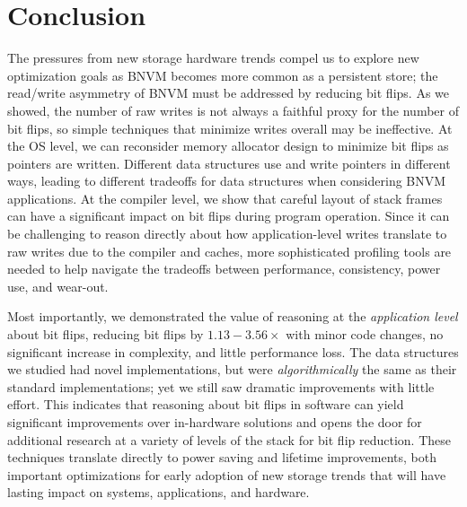 \section{Conclusion}
\label{sec:conclusion}

The pressures from new storage hardware trends compel us to explore new optimization goals as BNVM
becomes more common as a persistent store; the read/write asymmetry of BNVM must be addressed by
reducing bit flips.
As we showed, the
number of raw writes is not always a faithful proxy for the number of bit flips,
so simple techniques that minimize writes overall may be ineffective.
At the OS level, we can reconsider memory allocator design to
minimize bit flips as pointers are written. Different data structures use and
write pointers in different ways, leading to different tradeoffs for data
structures when considering BNVM applications. At the compiler level, we show
that careful layout of stack frames can have a significant impact on bit flips
during program operation. Since it can be challenging to reason directly about
how application-level writes translate to raw writes due to the compiler and
caches, more sophisticated profiling tools are needed to help navigate the
tradeoffs between performance, consistency, power use, and wear-out.

Most importantly, we demonstrated the value of reasoning at the \emph{application level} about bit
flips, reducing bit flips by $1.13-3.56\times$ with minor code changes, no significant increase in
complexity, and little performance loss. The data structures we studied had novel implementations,
but were \textit{algorithmically} the same as their standard implementations; yet we still saw
dramatic improvements with little effort. This indicates that reasoning about bit flips in software
can yield significant improvements over in-hardware solutions and opens the door for additional
research at a variety of levels of the stack for bit flip reduction.  These techniques translate
directly to power saving and lifetime improvements, both important optimizations for early adoption
of new storage trends that will have lasting impact on systems, applications, and hardware.



